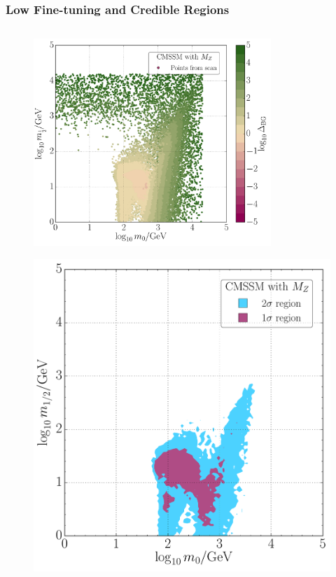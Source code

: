 \documentclass[10pt,aspectratio=169]{beamer}
\begin{document}
\begin{frame}
  \frametitle{Low Fine-tuning and Credible Regions}
  \begin{columns}[t]
    \begin{column}{0.7\textwidth}
      \begin{columns}[t]
        \begin{column}{0.5\textwidth}
          \vspace{-35pt}
          \begin{figure}
            \centering
            \includegraphics[width=0.8\textwidth]{CMSSM_BG_m0m12}
          \end{figure}
          \vspace{-20pt}
          \begin{figure}
            \centering
            \includegraphics[height=0.7\textwidth]{CMSSM_pdf_mz_m0m12}

\end{figure}
\end{column}
\end{columns}
\end{column}
\end{columns}
\end{frame}
\end{document}
